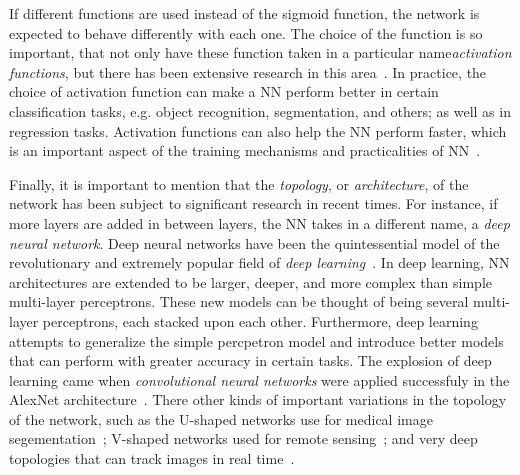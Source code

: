 If different functions are used instead of the sigmoid function, the network is expected to 
behave differently with each one. The choice of the function is so important, that not only 
have these function taken in a particular name\textemdash \emph{activation functions}\textemdash, but there has been extensive research in this area~\cite{chenUniversalApproximationNonlinear1995,nwankpaActivationFunctionsComparison2018,agostinelliLearningActivationFunctions2015,ramachandranSearchingActivationFunctions2017}. 
In practice, the choice of activation function can make a NN perform better in 
certain classification tasks, e.g. object recognition, segmentation, and others; as well as 
in regression tasks. Activation functions can also help the NN perform faster, which is 
an important aspect of the training mechanisms and practicalities of
NN~\cite{fengPerformanceAnalysisVarious2019,biswasTanhSoftDynamicTrainable2021}.

Finally, it is important to mention that the \emph{topology}, or \emph{architecture}, of 
the network has been subject to significant research in recent times. For instance, if more 
layers are added in between layers, the NN takes in a different name, a \emph{deep neural network}. Deep neural networks have been the quintessential model of the revolutionary and 
extremely popular field of \emph{deep learning}~\cite{goodfellowDeepLearning2016}. In deep 
learning, NN architectures are extended to be larger, deeper, and more complex than simple 
multi-layer perceptrons. These new models can be thought of being several multi-layer 
perceptrons, each stacked upon each other.
Furthermore, deep learning attempts to generalize the simple percpetron model and introduce 
better models that can perform with greater accuracy in certain tasks. The explosion of 
deep learning came when \emph{convolutional neural networks} were applied successfuly in 
the AlexNet architecture~\cite{krizhevskyImageNetClassificationDeep2012}. There other kinds 
of important variations in the topology of the network, such as the U-shaped networks use 
for medical image segementation~\cite{ronnebergerUNetConvolutionalNetworks2015}; V-shaped 
networks used for remote sensing~\cite{abdollahiVNetEndtoEndFully2020}; and very deep 
topologies that can track images in real time~\cite{redmonYOLOv3IncrementalImprovement2018}.

